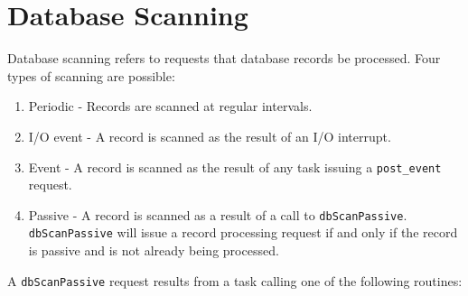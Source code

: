 \section{Database Scanning}

Database scanning refers to requests that database records be processed. Four types of scanning are possible:

\begin{enumerate}\item {}Periodic - Records are scanned at regular intervals.

\item {}I/O event - A record is scanned as the result of an I/O interrupt.

\item {}Event - A record is scanned as the result of any task issuing a \verb|post_event| request.

\item {}Passive - A record is scanned as a result of a call to \verb|dbScanPassive|. \verb|dbScanPassive| will issue a record 
processing request if and only if the record is passive and is not already being processed.

\end{enumerate}A \verb|dbScanPassive| request results from a task calling one of the following routines:

